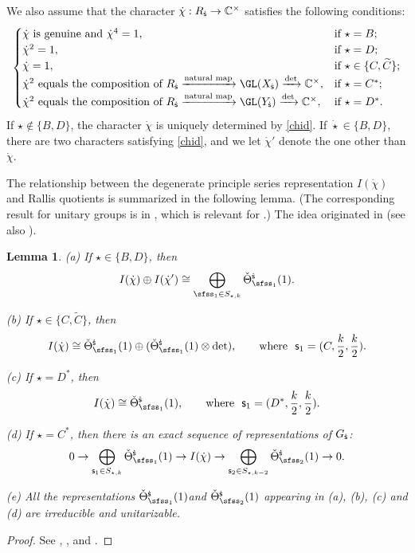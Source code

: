 \documentclass[11pt,a4paper]{amsart}
\newcommand{\be}{\begin {equation}}
\newcommand{\ee}{\end {equation}}
\numberwithin{equation}{section}
\newtheorem{lem}[thm]{Lemma}
\theoremstyle{remark}
\begin{document}
We also assume that the character $\dot \chi: R_{{\dot{\mathsf s}}}\rightarrow \mathbb{C}^\times $
satisfies  the following conditions:
\be\label{chid}
\begin{cases}
 \dot \chi \textrm{ is genuine and $\dot \chi^4=1$,}& \textrm{if $ \star=B$};\\
 \dot \chi^2=1,  & \textrm{if $\star=D$;}\\
 \dot \chi=1,\quad   &\textrm{if } \star\in \{C,\widetilde C\};\\
    \dot \chi^2\textrm{ equals the composition of $R_\dsfss\xrightarrow{\textrm{natural map}} \GL(X_\dsfss)\xrightarrow{\det}\C^\times$},  & \textrm{if $ \star=C^*$;}\\
 \dot \chi^2\textrm{ equals the composition of $R_\dsfss\xrightarrow{\textrm{natural map}} \GL(Y_\dsfss)\xrightarrow{\det}\C^\times$},  & \textrm{if $ \star=D^*$.}
\end{cases}
\ee
If  $\star\notin \{B,D\}$, the character   $\dot{\chi}$ is uniquely determined by \eqref{chid}.
If  $\dot \star\in \{B,D\}$, there are two characters satisfying \eqref{chid}, and we let $\dot \chi'$ denote the one other than $\dot \chi$.


The relationship between the degenerate principle series representation $I(\dot{\chi})$ and
Rallis quotients is summarized in the following lemma. (The corresponding result for unitary groups is in \cite[Introduction]{LZ1}, which is relevant for .) 
The idea originated in \cite[Section II]{Ra} (see also \cite{KR}).

\begin{lem}\label{degens}
\noindent
(a) If $\star\in \{B,D\}$,  then
\[
  I(\dot{\chi}) \oplus I(\dot \chi')\cong \bigoplus_{\sfss_1\in S_{\star, k}}
   \check \Theta_{\sfss_1}^{\dsfss}(1).
\]

\noindent
(b) If $\star\in \{C,\widetilde C\}$, then
\[
  I(\dot{\chi})\cong \check \Theta_{\sfss_1}^{\dsfss}(1)\oplus  (\check \Theta_{\sfss_1}^{\dsfss}(1)\otimes \det),\qquad \textrm{where } \ \mathsf s_1=(C, \frac{k}{2}, \frac{k}{2}).
\]


\noindent
(c) If $\star=D^*$, then
\[
  I(\dot{\chi})\cong \check \Theta_{\sfss_1}^{\dsfss}(1),\qquad \textrm{where }\ \mathsf s_1=(D^*,  \frac{k}{2}, \frac{k}{2}).
\]


\noindent
(d) If $\star=C^*$, then there is an exact sequence of representations of $G_{{\dot{\mathsf s}}}$:
\[
0\rightarrow \bigoplus_{\mathsf s_1\in S_{\star, k}} \check \Theta_{\sfss_1}^{\dsfss}(1) \rightarrow
 I(\dot{\chi})\rightarrow  \bigoplus_{\mathsf s_2\in S_{\star, k-2}} \check \Theta_{\sfss_2}^{\dsfss}(1) \rightarrow 0.
\]

\noindent
(e) All the representations $ \check \Theta_{\sfss_1}^{\dsfss}(1) $and $ \check \Theta_{\sfss_2}^{\dsfss}(1)$ appearing in (a), (b), (c) and (d) are irreducible and unitarizable.


\end{lem}
\begin{proof}
 See \cite[Theorem 2.4]{Ku}, \cite[Introduction]{LZ2}, \cite[Theorem 6.1]{LZ3} and  \cite[Sections 9 and 10]{Ya}.
\end{proof}
\end{document}
